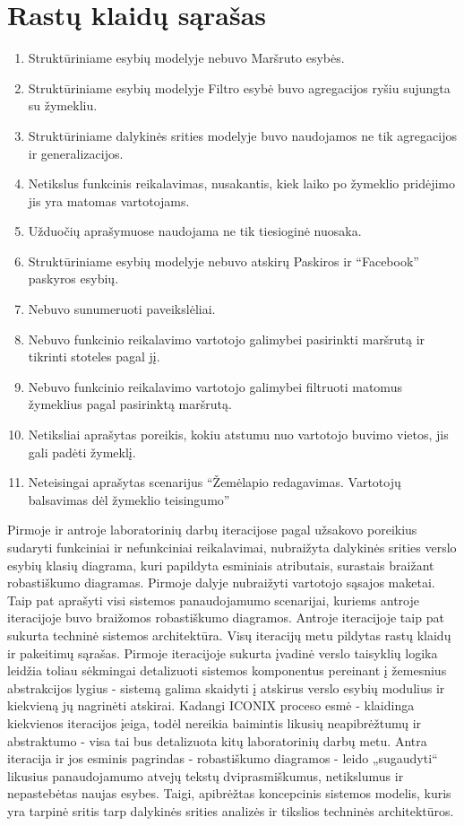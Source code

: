 \documentclass{VUMIFPSkursinis}
\begin{document}
\section{Rastų klaidų sąrašas}
	\begin{enumerate}[itemsep=-2mm]
		\item Struktūriniame esybių modelyje nebuvo Maršruto esybės.
		\item Struktūriniame esybių modelyje Filtro esybė buvo agregacijos ryšiu sujungta su žymekliu.
		\item Struktūriniame dalykinės srities modelyje buvo naudojamos ne tik agregacijos ir generalizacijos.
		\item Netikslus funkcinis reikalavimas, nusakantis, kiek laiko po žymeklio pridėjimo jis yra matomas vartotojams.
		\item Užduočių aprašymuose naudojama ne tik tiesioginė nuosaka.
		\item Struktūriniame esybių modelyje nebuvo atskirų Paskiros ir “Facebook” paskyros esybių.
		\item Nebuvo sunumeruoti paveikslėliai.
		\item Nebuvo funkcinio reikalavimo vartotojo galimybei pasirinkti maršrutą ir tikrinti stoteles pagal jį.
		\item Nebuvo funkcinio reikalavimo vartotojo galimybei filtruoti matomus žymeklius pagal pasirinktą maršrutą.
		\item Netiksliai aprašytas poreikis, kokiu atstumu nuo vartotojo buvimo vietos, jis gali padėti žymeklį.
		\item Neteisingai aprašytas scenarijus “Žemėlapio redagavimas. Vartotojų balsavimas dėl žymeklio teisingumo”
	\end{enumerate}
Pirmoje ir antroje laboratorinių darbų iteracijose pagal užsakovo poreikius sudaryti funkciniai ir nefunkciniai reikalavimai, nubraižyta dalykinės srities verslo esybių klasių diagrama, kuri papildyta esminiais atributais, surastais braižant robastiškumo diagramas. Pirmoje dalyje nubraižyti vartotojo sąsajos maketai. Taip pat aprašyti visi sistemos panaudojamumo scenarijai, kuriems antroje iteracijoje buvo braižomos robastiškumo diagramos. Antroje iteracijoje taip pat sukurta techninė sistemos architektūra. Visų iteracijų metu pildytas rastų klaidų ir pakeitimų sąrašas.
Pirmoje iteracijoje sukurta įvadinė verslo taisyklių logika leidžia toliau sėkmingai detalizuoti sistemos komponentus pereinant į žemesnius abstrakcijos lygius - sistemą galima skaidyti į atskirus verslo esybių modulius ir kiekvieną jų nagrinėti atskirai. Kadangi ICONIX proceso esmė - klaidinga kiekvienos iteracijos įeiga, todėl nereikia baimintis likusių neapibrėžtumų ir abstraktumo - visa tai bus detalizuota kitų laboratorinių darbų metu. Antra iteracija ir jos esminis pagrindas - robastiškumo diagramos - leido „sugaudyti“ likusius panaudojamumo atvejų tekstų dviprasmiškumus, netikslumus ir nepastebėtas naujas esybes. Taigi, apibrėžtas koncepcinis sistemos modelis, kuris yra tarpinė sritis tarp dalykinės srities analizės ir tikslios techninės architektūros.
\end{document}
